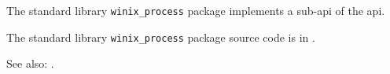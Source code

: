 

The standard library {\tt winix\_process} package implements a sub-api of the  api.

The standard library {\tt winix\_process} package source code is in .

See also: .

